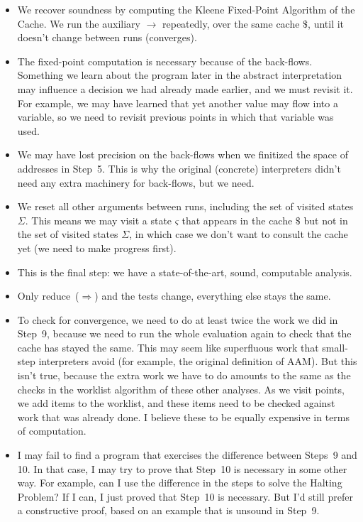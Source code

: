 \documentclass[12pt, oneside]{book}
\begin{document}
\begin{itemize}
  \item We recover soundness by computing the Kleene Fixed-Point Algorithm of the Cache. We run the auxiliary \(→\) repeatedly, over the same cache \(\$\), until it doesn’t change between runs (converges).
  \item The fixed-point computation is necessary because of the back-flows. Something we learn about the program later in the abstract interpretation may influence a decision we had already made earlier, and we must revisit it. For example, we may have learned that yet another value may flow into a variable, so we need to revisit previous points in which that variable was used.
  \item We may have lost precision on the back-flows when we finitized the space of addresses in Step~5. This is why the original (concrete) interpreters didn’t need any extra machinery for back-flows, but we need.
  \item We reset all other arguments between runs, including the set of visited states \(Σ\). This means we may visit a state \(ς\) that appears in the cache \(\$\) but not in the set of visited states \(Σ\), in which case we don’t want to consult the cache yet (we need to make progress first).
  \item This is the final step: we have a state-of-the-art, sound, computable analysis.
  \item Only reduce~(\(⇒\)) and the tests change, everything else stays the same.
  \item To check for convergence, we need to do at least twice the work we did in Step~9, because we need to run the whole evaluation again to check that the cache has stayed the same. This may seem like superfluous work that small-step interpreters avoid (for example, the original definition of AAM). But this isn’t true, because the extra work we have to do amounts to the same as the checks in the worklist algorithm of these other analyses. As we visit points, we add items to the worklist, and these items need to be checked against work that was already done. I believe these to be equally expensive in terms of computation.
  \item I may fail to find a program that exercises the difference between Steps~9 and 10. In that case, I may try to prove that Step~10 is necessary in some other way. For example, can I use the difference in the steps to solve the Halting Problem? If I can, I just proved that Step~10 is necessary. But I’d still prefer a constructive proof, based on an example that is unsound in Step~9.
\end{itemize}
\end{document}
